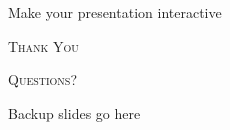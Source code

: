 \documentclass{minesbeamer}
\begin{document}
\begin{frame}{Make your presentation interactive}
    \begin{cublock}
        \begin{overlayarea}{\textwidth}{\baselineskip}
        \end{overlayarea}
    \end{cublock}
\end{frame}

\begin{frame}[standout]
    \Huge\textsc{Thank You}
    
    \vfill
    
    \LARGE\textsc{Questions?}
\end{frame}

\appendix

\begin{frame}{Backup slides go here}
    
\end{frame}
\end{document}
